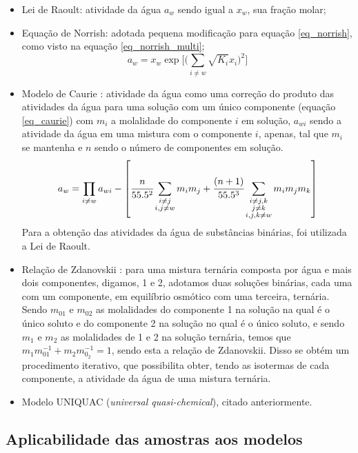 \documentclass[
	12pt,				%
	openright,
	twoside,
	a4paper,			%
	english,			%
	french,				%
	spanish,			%
	brazil				%
	]{abntex2}
\begin{document}
\begin{itemize}
	\item Lei de Raoult: atividade da água $a_w$ sendo igual a $x_w$,
		sua fração molar;
	\item Equação de Norrish: adotada pequena modificação para equação
		\ref{eq_norrish}, como visto na equação \ref{eq_norrish_multi};
		\begin{equation}
			\label{eq_norrish_multi}
			a_w = x_w\exp\Big[\Big(\sum_{i \neq w}%
			\sqrt{K_i}x_i\Big)^2\Big]
		\end{equation}
	\item Modelo de Caurie \cite{caurie1986}: atividade da água como uma
		correção do produto das atividades da água para uma solução
		com um único componente (equação \ref{eq_caurie}) com
		$m_i$ a molalidade do componente $i$ em solução, $a_{wi}$
		sendo a atividade da água em uma mistura com o componente
		$i$, apenas, tal que $m_i$ se mantenha e $n$ sendo o número de
		componentes em solução.
		\begin{equation}
			\label{eq_caurie}
			a_w = \prod_{i \neq w}a_{wi}-\left[\cfrac{n}%
			{55.5^2}\sum_{\substack{i \neq j \\ i,j \neq w}}%
			m_im_j + \cfrac{(n+1)}{55.5^3}\sum_{%
			\substack{i\neq j,k \\ j \neq k \\  i,j,k \neq w}}%
			m_im_jm_k\right]
		\end{equation}
		Para a obtenção das atividades da água de substâncias
		binárias, foi utilizada a Lei de Raoult.
	\item Relação de Zdanovskii \cite{chen1973,sangster1973}:
		para uma mistura ternária composta por água e mais dois
		componentes, digamos, 1 e 2, adotamos duas soluções binárias,
		cada uma com um componente, em equilíbrio osmótico com uma
		terceira, ternária. Sendo $m_{01}$ e $m_{02}$ as
		molalidades do componente 1 na solução na qual é o único
		soluto e do componente 2 na solução no qual é o único soluto, e
		sendo $m_1$ e $m_2$ as molalidades de 1 e 2 na solução ternária,
		temos que $m_1m_{01}^{-1} + m_2m_{0_2}^{-1} = 1$, sendo esta a
		relação de Zdanovskii. Disso se obtém um procedimento iterativo,
		que possibilita obter, tendo as isotermas de cada componente, a
		atividade da água de uma mistura ternária.
	\item Modelo UNIQUAC (\textit{universal quasi-chemical}), citado
		anteriormente.
\end{itemize}

\subsection{Aplicabilidade das amostras aos modelos}
\end{document}
